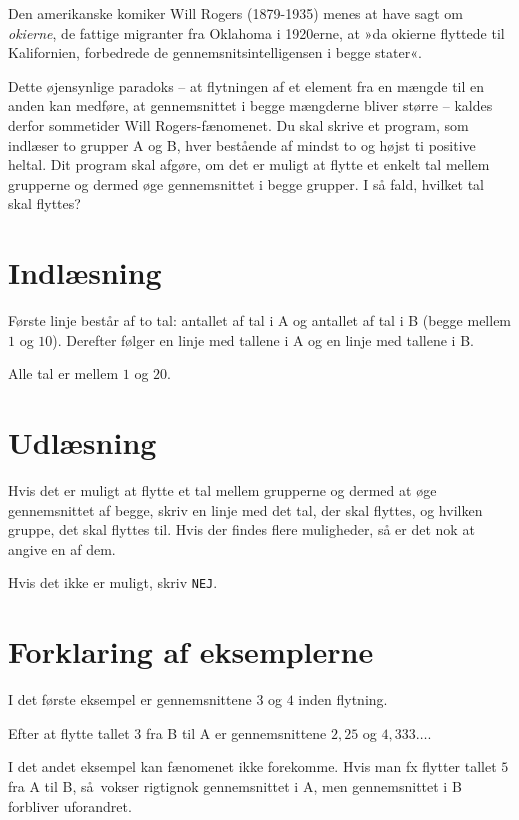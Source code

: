 Den amerikanske komiker Will Rogers (1879-1935) menes at have sagt om \emph{okierne}, de fattige migranter fra Oklahoma i 1920erne, at »da okierne  flyttede til Kalifornien, forbedrede de gennemsnitsintelligensen i begge stater«.

Dette øjensynlige paradoks -- at flytningen af et element fra en mængde til en anden kan medføre, at gennemsnittet i begge mængderne bliver større -- kaldes derfor sommetider Will Rogers-fænomenet.
Du skal skrive et program, som indlæser to grupper A og B, hver bestående af mindst to og højst ti positive heltal.
Dit program skal afgøre, om det er muligt at flytte et enkelt tal mellem grupperne og dermed øge gennemsnittet i begge grupper.
I så fald, hvilket tal skal flyttes?

\section*{Indlæsning}

Første linje består af to tal: antallet af tal i A og antallet af tal i B (begge mellem $1$ og $10$).
Derefter følger en linje med tallene i A og en linje med tallene i B.

Alle tal er mellem $1$ og $20$.

\section*{Udlæsning}
Hvis det er muligt at flytte et tal mellem grupperne og dermed at øge gennemsnittet af begge, skriv en linje med det tal, der skal flyttes, og hvilken gruppe, det skal flyttes til.
Hvis der findes flere muligheder, så er det nok at angive en af dem.

Hvis det ikke er muligt, skriv \texttt{NEJ}.

\section*{Forklaring af eksemplerne}

I det første eksempel er gennemsnittene $3$ og $4$ inden flytning.

Efter at flytte tallet $3$ fra B til A er gennemsnittene $2{,}25$ og $4{,}333\ldots$.

I det andet eksempel kan fænomenet ikke forekomme.
Hvis man fx flytter tallet $5$ fra A til B, så vokser rigtignok gennemsnittet i A, men gennemsnittet i B forbliver uforandret. 
